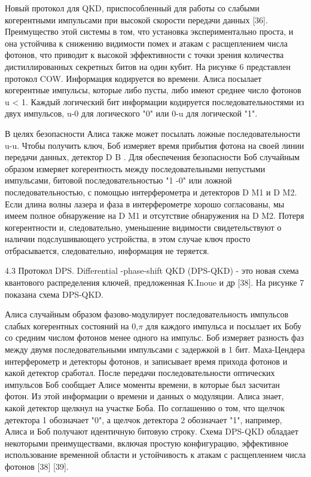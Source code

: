 Новый протокол для QKD, приспособленный для работы со слабыми когерентными импульсами при высокой скорости передачи данных [36]. Преимущество этой системы в том, что установка экспериментально проста, и она устойчива к снижению видимости помех и атакам с расщеплением числа фотонов, что приводит к высокой эффективности с точки зрения количества дистиллированных секретных битов на один кубит. На рисунке 6 представлен протокол COW. Информация кодируется во времени. Алиса посылает когерентные импульсы, которые либо пусты, либо имеют среднее число фотонов u < 1. Каждый логический бит информации кодируется последовательностями из двух импульсов, u-0 для логического "0" или 0-u для логической "1".

В целях безопасности Алиса также может посылать ложные последовательности u-u. Чтобы получить ключ, Боб измеряет время прибытия фотона на своей линии передачи данных, детектор D B . Для обеспечения безопасности Боб случайным образом измеряет когерентность между последовательными непустыми импульсами, битовой последовательностью "1 -0" или ложной последовательностью, с помощью интерферометра и детекторов D M1 и D M2. Если длина волны лазера и фаза в интерферометре хорошо согласованы, мы имеем полное обнаружение на D M1 и отсутствие обнаружения на D M2. Потеря когерентности и, следовательно, уменьшение видимости свидетельствуют о наличии подслушивающего устройства, в этом случае ключ просто отбрасывается, следовательно, информация не теряется.

4.3 Протокол DPS. Differential -phase-shift QKD (DPS-QKD) - это новая схема квантового распределения ключей, предложенная K.Inoue и др [38]. На рисунке 7 показана схема DPS-QKD.

Алиса случайным образом фазово-модулирует последовательность импульсов слабых когерентных состояний на {0,$\pi$} для каждого импульса и посылает их Бобу со средним числом фотонов менее одного на импульс. Боб измеряет разность фаз между двумя последовательными импульсами с задержкой в 1 бит. Маха-Цендера интерферометр и детекторы фотонов, и записывает время прихода фотонов и какой детектор сработал. После передачи последовательности оптических импульсов Боб сообщает Алисе моменты времени, в которые был засчитан фотон. Из этой информации о времени и данных о модуляции. Алиса знает, какой детектор щелкнул на участке Боба. По соглашению о том, что щелчок детектора 1 обозначает "0", а щелчок детектора 2 обозначает "1", например, Алиса и Боб получают идентичную битовую строку.
Схема DPS-QKD обладает некоторыми преимуществами, включая простую конфигурацию, эффективное использование временной области и устойчивость к атакам с расщеплением числа фотонов [38] [39].

